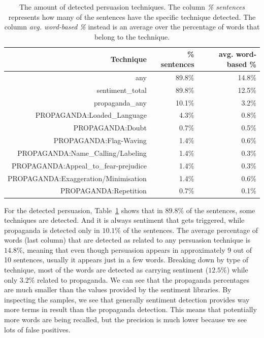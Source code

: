 \begin{table}[!htbp]
    \centering
    \begin{tabular}{r|rr}
         Technique & \% sentences & avg. word-based \% \\
         \hline
         any & 89.8\% & 14.8\% \\
        sentiment\_total & 89.8\% & 12.5\% \\
        propaganda\_any & 10.1\% & 3.2\% \\
        PROPAGANDA:Loaded\_Language & 4.3\% & 0.8\% \\
        PROPAGANDA:Doubt & 0.7\% & 0.5\% \\
        PROPAGANDA:Flag-Waving & 1.4\% & 0.6\% \\
        PROPAGANDA:Name\_Calling/Labeling & 1.4\% & 0.3\% \\
        PROPAGANDA:Appeal\_to\_fear-prejudice & 1.4\% & 0.3\% \\
        PROPAGANDA:Exaggeration/Minimisation & 1.4\% & 0.6\% \\
        PROPAGANDA:Repetition & 0.7\% & 0.1\% \\
    \end{tabular}
    \caption{The amount of detected persuasion techniques. The column \textit{\% sentences} represents how many of the sentences have the specific technique detected. The column \textit{avg. word-based \%} instead is an average over the percentage of words that belong to the technique.}
    \label{tab:detected_persuasion_in_variations}
\end{table}

For the detected persuasion, Table~\ref{tab:detected_persuasion_in_variations} shows that in $89.8\%$ of the sentences, some techniques are detected. And it is always sentiment that gets triggered, while propaganda is detected only in $10.1\%$ of the sentences.
The average percentage of words (last column) that are detected as related to any persuasion technique is $14.8\%$, meaning that even though persuasion appears in approximately 9 out of 10 sentences, usually it appears just in a few words. Breaking down by type of technique, most of the words are detected as carrying sentiment ($12.5\%$) while only $3.2\%$ related to propaganda.
We can see that the propaganda percentages are much smaller than the values provided by the sentiment libraries.
By inspecting the samples, we see that generally sentiment detection provides way more terms in result than the propaganda detection. This means that potentially more words are being recalled, but the precision is much lower because we see lots of false positives.

